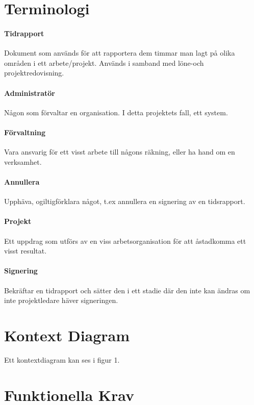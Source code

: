 \documentclass[paper=a4, fontsize=11pt,twoside]{article}
\begin{document}
	\section{Terminologi}
	\paragraph{Tidrapport}
	\flushleft
	Dokument som används för att rapportera dem timmar man lagt på olika områden i ett arbete/projekt. Används i samband med löne-och projektredovisning.
	\paragraph{Administratör}
	\flushleft
	Någon som förvaltar en organisation. I detta projektets fall, ett system.
	\paragraph{Förvaltning}
	\flushleft
	Vara ansvarig för ett visst arbete till någons räkning, eller ha hand om en verksamhet.
	\paragraph{Annullera}
	\flushleft
	Upphäva, ogiltigförklara något, t.ex annullera en signering av en tidsrapport.
	\paragraph{Projekt}
	\flushleft
	Ett uppdrag som utförs av en viss arbetsorganisation för att åstadkomma ett visst resultat. 
	\paragraph{Signering}
	\flushleft
	Bekräftar en tidrapport och sätter den i ett stadie där den inte kan ändras om inte projektledare häver signeringen.
	\paragraph{}
	\newpage
	\section{Kontext Diagram}
	Ett kontextdiagram kan ses i figur 1.
	
	\section{Funktionella Krav}
	
\end{document}
